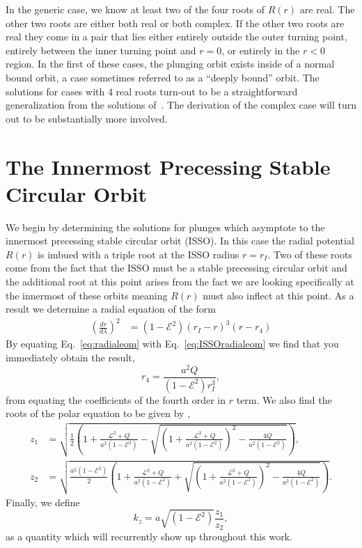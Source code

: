 \documentclass[12pt, amsmath]{revtex4-2}
\newcommand\EN{\mathcal{E}}
\begin{document}
In the generic case, we know at least two of the four roots of $R(r)$ are real. The other two roots are either both real or both complex. If the other two roots are real they come in a pair that lies either entirely outside the outer turning point, entirely between the inner turning point and $r=0$, or entirely in the $r<0$ region. In the first of these cases, the plunging orbit exists inside of a normal bound orbit, a case sometimes referred to as  a ``deeply bound'' orbit. The solutions for cases with 4 real roots turn-out to be a straightforward generalization from the solutions of~\cite{Fujita:2009bp,vandeMeent:2019cam}. The derivation of the complex case will turn out to be substantially more involved.


\section{The Innermost Precessing Stable Circular Orbit}\label{sec:ISSO}

We begin by determining the solutions for plunges which asymptote to the innermost precessing stable circular orbit (ISSO). In this case the radial potential $R(r)$ is imbued with a triple root at the ISSO radius $r=r_I$. Two of these roots come from the fact that the ISSO must be a stable precessing circular orbit and the additional root at this point arises from the fact we are looking specifically at the innermost of these orbits meaning $R(r)$ must also inflect at this point. As a result we determine a radial equation of the form 
\begin{align}\label{eq:ISSOradialeom}
        \left(\frac{dr}{d\lambda}\right)^2 
        &=(1-\EN^2)(r_I-r)^3(r-r_4)
\end{align}
By equating Eq.~\eqref{eq:radialeom} with Eq.~\eqref{eq:ISSOradialeom} we find that you immediately obtain the result,
\begin{equation}
    r_4 = \frac{a^2Q}{(1-\EN^2)r_{I}^{3}},
\end{equation}
from equating the coefficients of the fourth order in $r$ term. We also find the roots of the polar equation to be given by \cite{Gralla:2019ceu},
\begin{subequations}\label{Equations of Motion}
    \begin{align}
        z_1 &= \sqrt{\frac{1}{2}\left(1+\frac{\mathcal{L}^2+Q}{a^2(1-\EN^2)}-\sqrt{\left(1 + \frac{\mathcal{L}^2+Q}{a^2(1-\EN^2)}\right)^2-\frac{4Q}{a^2(1-\EN^2)}}\right)},\\
         z_2&=\sqrt{ \frac{a^2(1-\EN^2)}{2}\left(1+\frac{\mathcal{L}^2+Q}{a^2(1-\EN^2)}+\sqrt{\left(1 + \frac{\mathcal{L}^2+Q}{a^2(1-\EN^2)}\right)^2-\frac{4Q}{a^2(1-\EN^2)}}\right)}.
    \end{align}
\end{subequations}
Finally, we define
\begin{equation}\label{Equations of Motion}
        k_z = a\sqrt{(1-\EN^2)}\frac{z_1}{z_2},
\end{equation}
as a quantity which will recurrently show up throughout this work.
\end{document}
